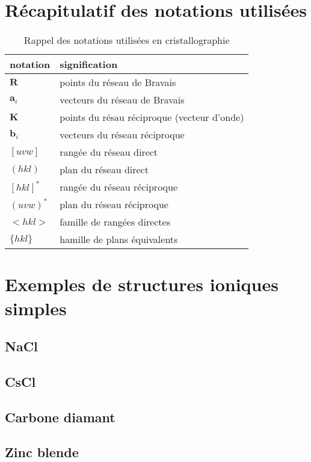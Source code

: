 \section{Récapitulatif des notations utilisées}

\begin{table}[ht]
\begin{tabularx}{.8\textwidth}{ll}
\toprule
notation & signification \\
\midrule
$\mathbf{R}$ & points du réseau de Bravais \\
$\mathbf{a}_i$ & vecteurs du réseau de Bravais \\
$\mathbf{K}$ & points du résau réciproque (vecteur d'onde) \\
$\mathbf{b}_i$ & vecteurs du réseau réciproque \\
$[u v w]$ & rangée du réseau direct\\
$(hkl)$ & plan du réseau direct \\
$[hkl]^*$ & rangée du réseau réciproque \\
$(uvw)^*$ & plan du réseau réciproque \\
$<hkl>$ & famille de rangées directes \\
$\{hkl\}$ & hamille de plans équivalents\\
\bottomrule
\end{tabularx}
\caption[Notations utilisées en cristallographie]{Rappel des notations utilisées en cristallographie}
\label{tab:rappel}
\end{table}


\section{Exemples de structures ioniques simples}
\subsection{NaCl}
\subsection{CsCl}
\subsection{Carbone diamant}
\subsection{Zinc blende}
